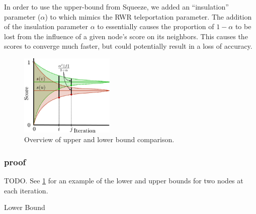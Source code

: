 In order to use the upper-bound from Squeeze, we added an ``insulation'' parameter ($\alpha$) to \sinksource which mimics the RWR teleportation parameter. 
The addition of the insulation parameter $\alpha$ to \sinksource essentially causes the proportion of $1 - \alpha$ to be lost from the influence of a given node's score on its neighbors.
This causes the scores to converge much faster, but could potentially result in a loss of accuracy. 



\begin{figure}[htb]
    \centering
    \includegraphics[width=0.4\textwidth]{figs/sink-source-squeeze-score-lb-ub-node-u-and-v-iteration-j.pdf}
    \caption{Overview of \SSS upper and lower bound comparison.}
    \label{fig:sinksource-squeeze-ub-lb}
\end{figure}

\subsubsection{\SSS proof}
TODO. See \cref{fig:sinksource-squeeze-ub-lb} for an example of the lower and upper bounds for two nodes at each iteration.

\par{Lower Bound}
\begin{lemma}
\end{lemma}

